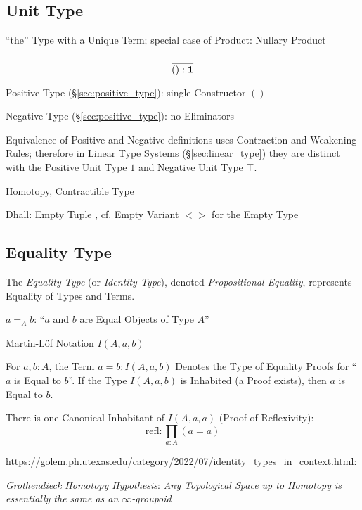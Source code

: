\subsection{Unit Type}\label{sec:unit_type}

``the'' Type with a Unique Term; special case of Product: Nullary
Product

\[
  \frac{}
  {():\mathbf{1}}
\]

Positive Type (\S\ref{sec:positive_type}): single Constructor $()$

Negative Type (\S\ref{sec:positive_type}): no Eliminators

Equivalence of Positive and Negative definitions uses Contraction and
Weakening Rules; therefore in Linear Type Systems
(\S\ref{sec:linear_type}) they are distinct with the Positive Unit
Type $1$ and Negative Unit Type $\top$.

Homotopy, Contractible Type %

Dhall: Empty Tuple ${}$, cf. Empty Variant $<>$ for the Empty Type



\subsection{Equality Type}\label{sec:equality_type}

The \emph{Equality Type} (or \emph{Identity Type}), denoted
\emph{Propositional Equality}, represents Equality of Types and Terms.

$a =_A b$: ``$a$ and $b$ are Equal Objects of Type $A$''

Martin-L\"of Notation $I(A,a,b)$

For $a,b:A$, the Term $a = b : I(A,a,b)$ Denotes the Type of Equality
Proofs for ``$a$ is Equal to $b$''. If the Type $I(A,a,b)$ is
Inhabited (a Proof exists), then $a$ is Equal to $b$.

There is one Canonical Inhabitant of $I(A,a,a)$ (Proof of
Reflexivity):
\[
  \text{refl}: \prod_{a:A} (a=a)
\]

\url{https://golem.ph.utexas.edu/category/2022/07/identity_types_in_context.html}:

\emph{Grothendieck Homotopy Hypothesis}:
\emph{
  Any Topological Space up to Homotopy is essentially the same as an
  $\infty$-groupoid
}

